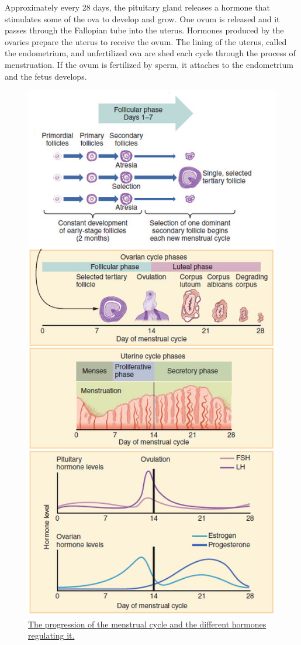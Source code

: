 Approximately every 28 days, the pituitary gland releases a hormone that stimulates some of the ova to develop and grow. One ovum is released and it passes through the Fallopian tube into the uterus. Hormones produced by the ovaries prepare the uterus to receive the ovum. The lining of the uterus, called the endometrium, and unfertilized ova are shed each cycle through the process of menstruation. If the ovum is fertilized by sperm, it attaches to the endometrium and the fetus develops.



\begin{figure}

{\centering \includegraphics[width=0.7\linewidth]{./figures/reproductive_system/Figure_28_02_07} 

}

\caption{\href{https://upload.wikimedia.org/wikipedia/commons/f/f3/Figure_28_02_07.jpg}{The progression of the menstrual cycle and the different hormones regulating it.}}\label{fig:menstrualcycle}
\end{figure}

